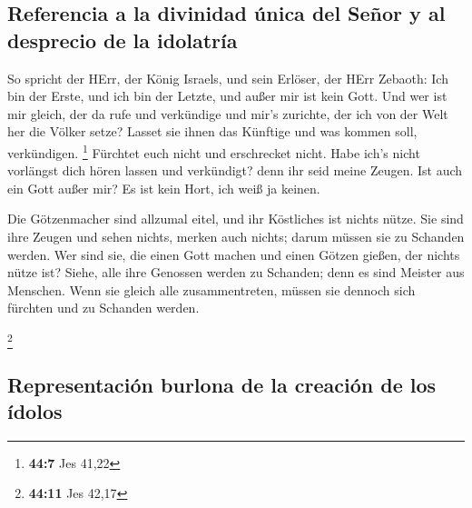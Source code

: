 \hypertarget{referencia-a-la-divinidad-uxfanica-del-seuxf1or-y-al-desprecio-de-la-idolatruxeda}{%
\subsection{Referencia a la divinidad única del Señor y al desprecio de
la
idolatría}\label{referencia-a-la-divinidad-uxfanica-del-seuxf1or-y-al-desprecio-de-la-idolatruxeda}}

 So spricht der HErr, der König Israels, und sein Erlöser,
der HErr Zebaoth: Ich bin der Erste, und ich bin der Letzte, und außer
mir ist kein Gott.  Und wer ist mir gleich, der da rufe
und verkündige und mir's zurichte, der ich von der Welt her die Völker
setze? Lasset sie ihnen das Künftige und was kommen soll, verkündigen.
\footnote{\textbf{44:7} Jes 41,22}  Fürchtet euch nicht
und erschrecket nicht. Habe ich's nicht vorlängst dich hören lassen und
verkündigt? denn ihr seid meine Zeugen. Ist auch ein Gott außer mir? Es
ist kein Hort, ich weiß ja keinen.

 Die Götzenmacher sind allzumal eitel, und ihr Köstliches
ist nichts nütze. Sie sind ihre Zeugen und sehen nichts, merken auch
nichts; darum müssen sie zu Schanden werden.  Wer sind
sie, die einen Gott machen und einen Götzen gießen, der nichts nütze
ist?  Siehe, alle ihre Genossen werden zu Schanden; denn
es sind Meister aus Menschen. Wenn sie gleich alle zusammentreten,
müssen sie dennoch sich fürchten und zu Schanden werden.

\footnote{\textbf{44:11} Jes 42,17}

\hypertarget{representaciuxf3n-burlona-de-la-creaciuxf3n-de-los-uxeddolos}{%
\subsection{Representación burlona de la creación de los
ídolos}\label{representaciuxf3n-burlona-de-la-creaciuxf3n-de-los-uxeddolos}}

